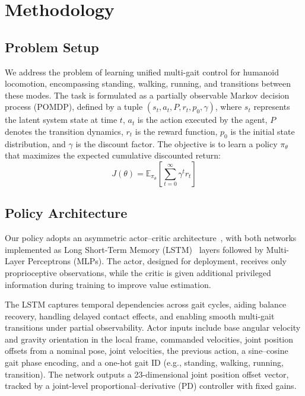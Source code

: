 \documentclass[letterpaper, 10 pt, conference]{ieeeconf}
\begin{document}
\section{Methodology}

\subsection{Problem Setup}

We address the problem of learning unified multi-gait control for humanoid locomotion, encompassing standing, walking, running, and transitions between these modes. The task is formulated as a partially observable Markov decision process (POMDP), defined by a tuple \((s_t, a_t, P, r_t, p_0, \gamma)\), where \(s_t\) represents the latent system state at time \(t\), \(a_t\) is the action executed by the agent, \(P\) denotes the transition dynamics, \(r_t\) is the reward function, \(p_0\) is the initial state distribution, and \(\gamma\) is the discount factor. The objective is to learn a policy \(\pi_\theta\) that maximizes the expected cumulative discounted return:
\begin{equation}
J(\theta) = \mathbb{E}_{\pi_\theta} \left[\sum_{t=0}^{\infty} \gamma^t r_t \right]
\end{equation}


\subsection{Policy Architecture}

Our policy adopts an asymmetric actor–critic architecture~\cite{andrychowicz2020learning}, with both networks implemented as Long Short-Term Memory (LSTM)~\cite{hochreiter1997lstm} layers followed by Multi-Layer Perceptrons (MLPs). The actor, designed for deployment, receives only proprioceptive observations, while the critic is given additional privileged information during training to improve value estimation.

The LSTM captures temporal dependencies across gait cycles, aiding balance recovery, handling delayed contact effects, and enabling smooth multi-gait transitions under partial observability. Actor inputs include base angular velocity and gravity orientation in the local frame, commanded velocities, joint position offsets from a nominal pose, joint velocities, the previous action, a sine–cosine gait phase encoding, and a one-hot gait ID (e.g., standing, walking, running, transition). The network outputs a 23-dimensional joint position offset vector, tracked by a joint-level proportional–derivative (PD) controller with fixed gains.
\end{document}
